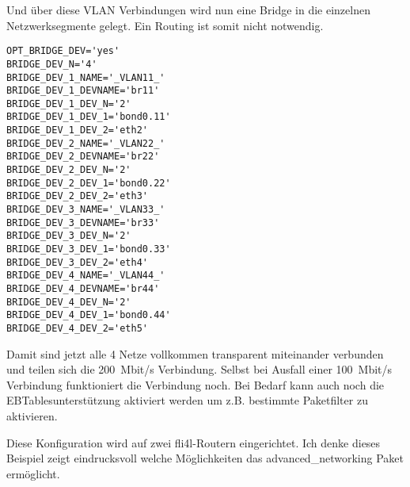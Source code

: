 Und über diese VLAN Verbindungen wird nun eine Bridge in die einzelnen
Netzwerksegmente gelegt. Ein Routing ist somit nicht notwendig.

\begin{example}
\begin{verbatim}
OPT_BRIDGE_DEV='yes'
BRIDGE_DEV_N='4'
BRIDGE_DEV_1_NAME='_VLAN11_'
BRIDGE_DEV_1_DEVNAME='br11'
BRIDGE_DEV_1_DEV_N='2'
BRIDGE_DEV_1_DEV_1='bond0.11'
BRIDGE_DEV_1_DEV_2='eth2'
BRIDGE_DEV_2_NAME='_VLAN22_'
BRIDGE_DEV_2_DEVNAME='br22'
BRIDGE_DEV_2_DEV_N='2'
BRIDGE_DEV_2_DEV_1='bond0.22'
BRIDGE_DEV_2_DEV_2='eth3'
BRIDGE_DEV_3_NAME='_VLAN33_'
BRIDGE_DEV_3_DEVNAME='br33'
BRIDGE_DEV_3_DEV_N='2'
BRIDGE_DEV_3_DEV_1='bond0.33'
BRIDGE_DEV_3_DEV_2='eth4'
BRIDGE_DEV_4_NAME='_VLAN44_'
BRIDGE_DEV_4_DEVNAME='br44'
BRIDGE_DEV_4_DEV_N='2'
BRIDGE_DEV_4_DEV_1='bond0.44'
BRIDGE_DEV_4_DEV_2='eth5'
\end{verbatim}
\end{example}

Damit sind jetzt alle 4 Netze vollkommen transparent miteinander
verbunden und teilen sich die 200~Mbit/s Verbindung. Selbst bei Ausfall
einer 100~Mbit/s Verbindung funktioniert die Verbindung noch. Bei Bedarf
kann auch noch die EBTablesunterstützung aktiviert werden um
z.B. bestimmte Paketfilter zu aktivieren.

Diese Konfiguration wird auf zwei fli4l-Routern eingerichtet. Ich denke
dieses Beispiel zeigt eindrucksvoll welche Möglichkeiten das
advanced\_networking Paket ermöglicht.

